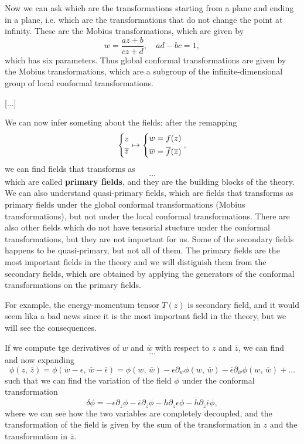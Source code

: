 Now we can ask which are the transformations starting from a plane and ending in a plane, i.e. which are the transformations that do not change the point at infinity. These are the Mobius transformations, which are given by
\[
    w = \frac{az + b}{cz + d}, \quad ad - bc = 1,
\]
which has six parameters. Thus global conformal transformations are given by the Mobius transformations, which are a subgroup of the infinite-dimensional group of local conformal transformations.

    [...]

We can now infer someting about the fields: after the remapping
\[
    \begin{dcases}
        z \\
        \overline{z}
    \end{dcases} \mapsto \begin{dcases}
        w = f(z) \\
        \overline{w} = \overline{f}(\overline{z})
    \end{dcases},
\]
we can find fields that transforms as
\[
    \dots
\]
which are called \textbf{primary fields}, and they are the building blocks of the theory. We can also understand quasi-primary fields, which are fields that transforms as primary fields under the global conformal transformations (Mobius transformations), but not under the local conformal transformations. There are also other fields which do not have tensorial stucture under the conformal transformations, but they are not important for us. Some of the secondary fields happens to be quasi-primary, but not all of them. The primary fields are the most important fields in the theory and we will distiguish them from the secondary fields, which are obtained by applying the generators of the conformal transformations on the primary fields.

For example, the energy-momentum tensor \(T(z)\) is secondary field, and it would seem lika a bad news since it is the most important field in the theory, but we will see the consequences.

If we compute tge derivatives of \(w\) and \(\overline{w}\) with respect to \(z\) and \(\overline{z}\), we can find
\[
    \dots
\]
and now expanding
\[
    \phi(z, \, \overline{z}) = \phi(w - \epsilon, \, \overline{w} - \overline{\epsilon}) = \phi(w, \, \overline{w}) - \epsilon \partial_w \phi(w, \, \overline{w}) - \overline{\epsilon} \partial_{\overline{w}} \phi(w, \, \overline{w}) + \dots
\]
such that we can find the variation of the field \(\phi\) under the conformal transformation
\[
    \delta \phi = - \epsilon \partial_z \phi - \overline{\epsilon} \partial_{\overline{z}} \phi - h \partial_z \epsilon \phi - \overline{h} \partial_{\overline{z}} \overline{\epsilon} \phi,
\]
where we can see how the two variables are completely decoupled, and the transformation of the field is given by the sum of the transformation in \(z\) and the transformation in \(\overline{z}\).

